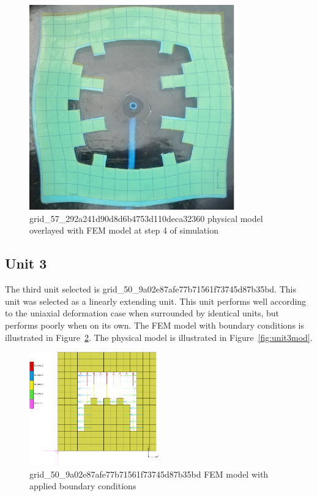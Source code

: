 \begin{figure}[H]
	\centering
	\includegraphics[width=0.8\textwidth]{unit2defover.png}
	\caption[Physical model of unit 2 overlayed with FEM model]{grid\_57\_292a241d90d8d6b4753d110deca32360 physical model overlayed with FEM model at step 4 of simulation}
	\label{fig:unit2over}
\end{figure}

\subsection{Unit 3}

The third unit selected is grid\_50\_9a02e87afe77b71561f73745d87b35bd. This unit was selected as a linearly extending unit. This unit performs well according to the uniaxial deformation case when surrounded by identical units, but performs poorly when on its own. The FEM model with boundary conditions is illustrated in Figure~\ref{fig:unit3bc}. The physical model is illustrated in Figure~\ref{fig:unit3mod}.

\begin{figure}[H]
	\centering
	\includegraphics[width=0.5\textwidth]{unit3bc.png}
	\caption[FEM validation model of unit 3]{grid\_50\_9a02e87afe77b71561f73745d87b35bd FEM model with applied boundary conditions}
	\label{fig:unit3bc}
\end{figure}

